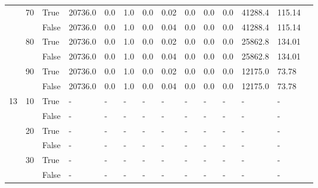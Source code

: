 \begin{landscape}
\begin{small}
\begin{longtable}[c]{@{}lll|ll|ll|ll|ll|lll@{}}
   & 70 & True  & 20736.0         & 0.0            & 1.0           & 0.0           & 0.02          & 0.0           & 0.0           & 0.0           & 41288.4       & 115.14      &  \\
   &    & False & 20736.0         & 0.0            & 1.0           & 0.0           & 0.04          & 0.0           & 0.0           & 0.0           & 41288.4       & 115.14      &  \\
   & 80 & True  & 20736.0         & 0.0            & 1.0           & 0.0           & 0.02          & 0.0           & 0.0           & 0.0           & 25862.8       & 134.01      &  \\
   &    & False & 20736.0         & 0.0            & 1.0           & 0.0           & 0.04          & 0.0           & 0.0           & 0.0           & 25862.8       & 134.01      &  \\
   & 90 & True  & 20736.0         & 0.0            & 1.0           & 0.0           & 0.02          & 0.0           & 0.0           & 0.0           & 12175.0       & 73.78       &  \\
   &    & False & 20736.0         & 0.0            & 1.0           & 0.0           & 0.04          & 0.0           & 0.0           & 0.0           & 12175.0       & 73.78       &  \\
  \midrule
13 & 10 & True  & -               & -              & -             & -             & -             & -             & -             & -             & -             & -           &  \\
   &    & False & -               & -              & -             & -             & -             & -             & -             & -             & -             & -           &  \\
   & 20 & True  & -               & -              & -             & -             & -             & -             & -             & -             & -             & -           &  \\
   &    & False & -               & -              & -             & -             & -             & -             & -             & -             & -             & -           &  \\
   & 30 & True  & -               & -              & -             & -             & -             & -             & -             & -             & -             & -           &  \\
   &    & False & -               & -              & -             & -             & -             & -             & -             & -             & -             & -           &  \\

\end{longtable}
\end{small}
\end{landscape}
